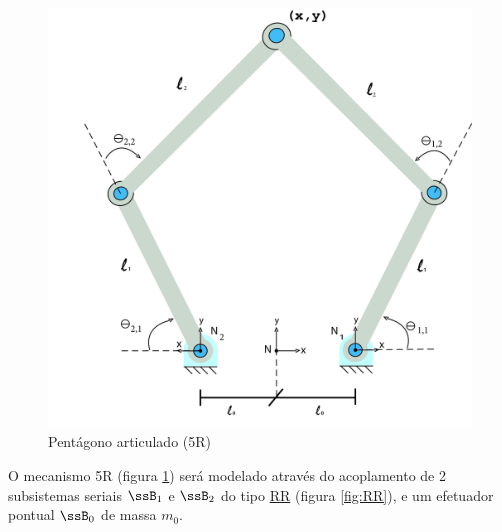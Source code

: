 \documentclass[]{politex}
\begin{document}
\begin{figure}[h]
	\centering
	\includegraphics[scale=0.10]{../figures/5Rscan.jpg}  
	\caption{Pentágono articulado (5R)}
	\label{fig:5R}
\end{figure}

O mecanismo 5R (figura \ref{fig:5R}) será modelado através do acoplamento de 2 subsistemas seriais $\ssB_1$ e $\ssB_2$ do tipo \underline{R}\underline{R} (figura \ref{fig:RR}), e um efetuador pontual $\ssB_0$ de massa $m_0$.
\end{document}
